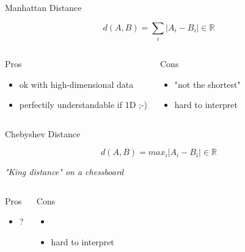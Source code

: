 \documentclass{beamer}
\begin{document}
\begin{frame}{Manhattan Distance}

$$d(A,B)= \sum_{i}|A_i-B_i| \in \mathbb{R}$$



\begin{scriptsize}
\begin{columns}[T,onlytextwidth]
\begin{block}{Pros}
\begin{itemize}
  \item ok with high-dimensional data
  \item perfectily understandable if 1D ;-)
\end{itemize}
\end{block}
\begin{block}{Cons}
\begin{spacing}{0.9}
\begin{itemize}
  \item "not the shortest"
  \item hard to interpret
\end{itemize}
\end{spacing}
\end{block}
\end{columns}
\end{scriptsize}




\end{frame}



\begin{frame}{Chebyshev Distance}

$$d(A,B)= max_i |A_i-B_i| \in \mathbb{R}$$


\textit{"King distance"  on a chessboard}

\begin{scriptsize}
\begin{columns}[T,onlytextwidth]
\begin{block}{Pros}
\begin{itemize}
  \item ? 
\end{itemize}
\end{block}
\begin{block}{Cons}
\begin{spacing}{0.9}
\begin{itemize}
  \item 
  \item hard to interpret
\end{itemize}
\end{spacing}
\end{block}
\end{columns}
\end{scriptsize}




\end{frame}
\end{document}
